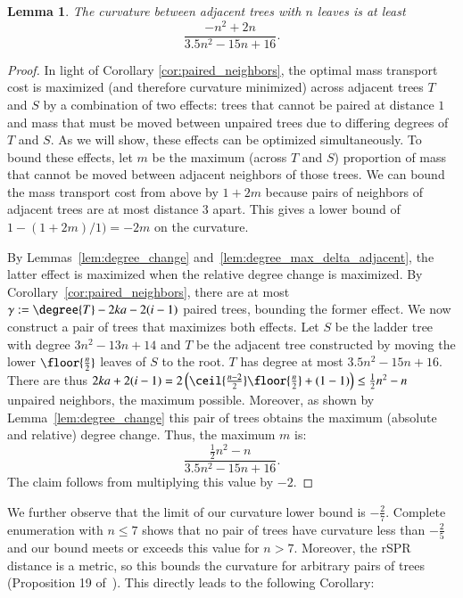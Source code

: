 \documentclass[]{elsarticle}
\newtheorem{lem}[thm]{Lemma}
\newcommand{\overlap}{%
	\gamma
}
\begin{document}
\begin{lem}
\label{lem:curvature_lower_bound}
	The curvature between adjacent trees with $n$ leaves is at least
	$$\frac{-n^2 + 2n}{3.5n^2 - 15n + 16}.$$
\end{lem}
\begin{proof}
    In light of Corollary \ref{cor:paired_neighbors}, the optimal mass transport cost is maximized (and therefore curvature minimized) across adjacent trees $T$ and $S$ by a combination of two effects: trees that cannot be paired at distance $1$ and mass that must be moved between unpaired trees due to differing degrees of $T$ and $S$.
		As we will show, these effects can be optimized simultaneously.
    To bound these effects, let $m$ be the maximum (across $T$ and $S$) proportion of mass that cannot be moved between adjacent neighbors of those trees.
    We can bound the mass transport cost from above by $1 + 2m$ because pairs of neighbors of adjacent trees are at most distance 3 apart.
	This gives a lower bound of $1 - (1 + 2m) / 1) = -2m$ on the curvature.

	By Lemmas~\ref{lem:degree_change} and~\ref{lem:degree_max_delta_adjacent}, the latter effect is maximized when the relative degree change is maximized.
	By Corollary~\ref{cor:paired_neighbors}, there are at most $\overlap := \degree{T} -2ka - 2(i-1)$ paired trees, bounding the former effect.
	We now construct a pair of trees that maximizes both effects.
	Let $S$ be the ladder tree with degree $3n^2 - 13n + 14$ and $T$ be the adjacent tree constructed by moving the lower $\floor{\frac{n}{2}}$ leaves of $S$ to the root.
	$T$ has degree at most $3.5n^2 -15n + 16$.
	There are thus $2ka + 2(i-1) = 2\left(\ceil{\frac{n-2}{2}}\floor{\frac{n}{2}} +(1-1)\right) \le \frac{1}{2}n^2 - n$ unpaired neighbors, the maximum possible.
	Moreover, as shown by Lemma~\ref{lem:degree_change} this pair of trees obtains the maximum (absolute and relative) degree change.
	Thus, the maximum $m$ is:
	$$\frac{\frac{1}{2}n^2 - n}{3.5n^2 - 15n + 16}.$$
	The claim follows from multiplying this value by $-2$.
\end{proof}

We further observe that the limit of our curvature lower bound is $-\frac{2}{7}$.
Complete enumeration with $n \le 7$ shows that no pair of trees have curvature less than $-\frac{2}{5}$ and our bound meets or exceeds this value for $n > 7$.
Moreover, the rSPR distance is a metric, so this bounds the curvature for arbitrary pairs of trees (Proposition 19 of~\citep{Ollivier2009-bw}).
This directly leads to the following Corollary:
\end{document}
